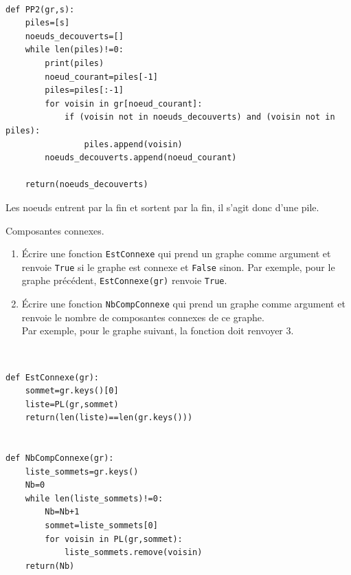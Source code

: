 \begin{solution}~\
\begin{verbatim}
def PP2(gr,s):
    piles=[s]
    noeuds_decouverts=[]
    while len(piles)!=0:
        print(piles)
        noeud_courant=piles[-1]
        piles=piles[:-1]
        for voisin in gr[noeud_courant]:
            if (voisin not in noeuds_decouverts) and (voisin not in piles):
                piles.append(voisin)   
        noeuds_decouverts.append(noeud_courant)
                
    return(noeuds_decouverts)
\end{verbatim}
Les noeuds entrent par la fin et sortent par la fin, il s'agit donc d'une pile.
\end{solution}


\begin{exercice}Composantes connexes.
\begin{enumerate}
\item Écrire une fonction \texttt{EstConnexe} qui prend un graphe comme argument et renvoie \texttt{True} si le graphe est connexe et \texttt{False} sinon.
Par exemple, pour le graphe précédent, \texttt{EstConnexe(gr)} renvoie \texttt{True}.
\item Écrire une fonction \texttt{NbCompConnexe} qui prend un graphe comme argument et renvoie le nombre de composantes connexes de ce graphe. \\
Par exemple, pour le graphe suivant, la fonction doit renvoyer 3.
\begin{center}
\end{center}
\end{enumerate}
\end{exercice}

\begin{solution}~\
\begin{verbatim}
def EstConnexe(gr):
    sommet=gr.keys()[0]
    liste=PL(gr,sommet)
    return(len(liste)==len(gr.keys()))


def NbCompConnexe(gr):
    liste_sommets=gr.keys()
    Nb=0
    while len(liste_sommets)!=0:
        Nb=Nb+1
        sommet=liste_sommets[0]
        for voisin in PL(gr,sommet):
            liste_sommets.remove(voisin)
    return(Nb) 
\end{verbatim}
\end{solution}

